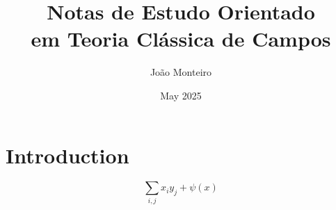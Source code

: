 \documentclass[12pt]{article}
\title{Notas de Estudo Orientado\\em Teoria Clássica de Campos}
\author{João Monteiro}
\date{May 2025}
\begin{document}
\maketitle

\section{Introduction}

\begin{equation*}
    \sum_{i,j} x_iy_j + \psi(x)
\end{equation*}
\end{document}
